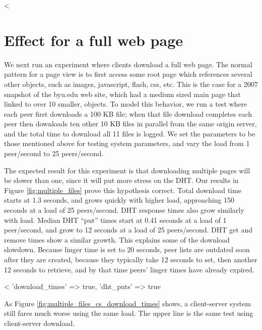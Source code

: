 

<%

\section{Effect for a full web page}

We next run an experiment where clients download a full web page.  The normal pattern for a page view 
is to first access some root page which references several other objects, such as images, 
javascript, flash, css, etc. This is the case for a 2007 snapshot of the byu.edu web site, which had a medium sized main page that 
linked to over 10 smaller, objects.  To model this behavior, we run a test where each peer first 
downloads a 100 KB file; when that file download completes each peer then downloads ten other 10 KB files in parallel from 
the same origin server, and the total time to download all 11 files is logged. We set the parameters 
to be those mentioned above for testing system parameters, and vary the load from 1 peer/second to 25 peers/second. 

The expected result for this experiment is that downloading multiple pages will be slower than one, 
since it will put more stress on the DHT.  Our results in Figure \ref{fig:multiple_files} prove
this hypothesis correct.  Total download time starts at 1.3 seconds, and grows quickly with higher load, approaching 
150 seconds at a load of 25 peers/second. DHT response times also grow similarly with load.  Median DHT ``put'' times start 
at 0.41 seconds at a load of 1 peer/second, and grow to 12 seconds at a load of 25 peers/second.  DHT get and remove times show a similar growth.
This explains some of the download slowdown.  Because linger time is set to 20 seconds, peer lists are outdated soon after they are created, because
they typically take 12 seconds to set, then another 12 seconds to retrieve, and by that time peers' linger times have already expired.


<%
   {'download_times' => true, 'dht_puts' => true} %

As Figure \ref{fig:multiple_files_cs_download_times} shows, a client-server system still fares much worse using the same load.  The upper line is the same test using client-server download.

